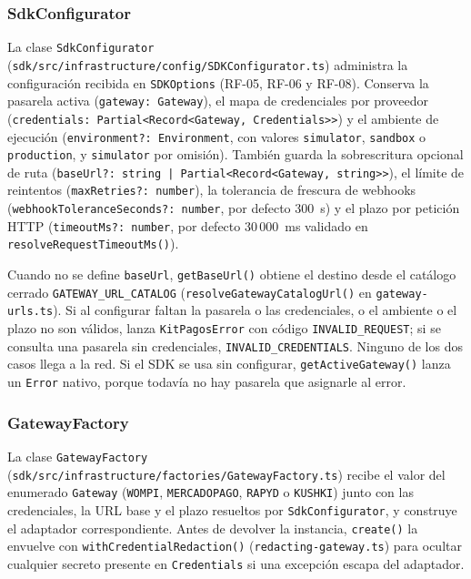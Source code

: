\subsubsection{SdkConfigurator}
La clase \texttt{SdkConfigurator} (\texttt{sdk/src/infrastructure/config/SDKConfigurator.ts}) administra la configuración recibida en \texttt{SDKOptions} (RF-05, RF-06 y RF-08). Conserva la pasarela activa (\texttt{gateway: Gateway}), el mapa de credenciales por proveedor (\texttt{credentials: Partial<Record<Gateway, Credentials>>}) y el ambiente de ejecución (\texttt{environment?: Environment}, con valores \texttt{simulator}, \texttt{sandbox} o \texttt{production}, y \texttt{simulator} por omisión). También guarda la sobrescritura opcional de ruta (\texttt{baseUrl?: string | Partial<Record<Gateway, string>>}), el límite de reintentos (\texttt{maxRetries?: number}), la tolerancia de frescura de webhooks (\texttt{webhook\allowbreak{}Tolerance\allowbreak{}Seconds?: number}, por defecto 300~s) y el plazo por petición HTTP (\texttt{timeoutMs?: number}, por defecto 30\,000~ms validado en \texttt{resolveRequestTimeoutMs()}).

Cuando no se define \texttt{baseUrl}, \texttt{getBaseUrl()} obtiene el destino desde el catálogo cerrado \texttt{GATEWAY\_URL\_CATALOG} (\texttt{resolveGatewayCatalogUrl()} en \texttt{gateway-urls.ts}). Si al configurar faltan la pasarela o las credenciales, o el ambiente o el plazo no son válidos, lanza \texttt{KitPagosError} con código \texttt{INVALID\_REQUEST}; si se consulta una pasarela sin credenciales, \texttt{INVALID\_CREDENTIALS}. Ninguno de los dos casos llega a la red. Si el SDK se usa sin configurar, \texttt{getActiveGateway()} lanza un \texttt{Error} nativo, porque todavía no hay pasarela que asignarle al error.

\subsubsection{GatewayFactory}
La clase \texttt{GatewayFactory} (\texttt{sdk/src/infrastructure/factories/GatewayFactory.ts}) recibe el valor del enumerado \texttt{Gateway} (\texttt{WOMPI}, \texttt{MERCADOPAGO}, \texttt{RAPYD} o \texttt{KUSHKI}) junto con las credenciales, la URL base y el plazo resueltos por \texttt{SdkConfigurator}, y construye el adaptador correspondiente. Antes de devolver la instancia, \texttt{create()} la envuelve con \texttt{withCredentialRedaction()} (\texttt{redacting-gateway.ts}) para ocultar cualquier secreto presente en \texttt{Credentials} si una excepción escapa del adaptador.

